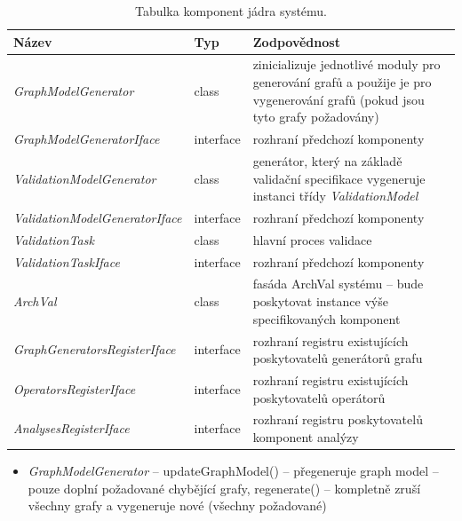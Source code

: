 \begin{table}
  \caption{Tabulka komponent jádra systému. \label{design-archval_core_components}}
  \begin{center}
    \begin{tabular}{ | l | l | p{7.5cm} | }
      \hline
      \textbf{Název} & \textbf{Typ} & \textbf{Zodpovědnost} \\
      \hline
      \hline
      \emph{GraphModelGenerator} & class & zinicializuje jednotlivé moduly pro generování grafů a použije je pro vygenerování grafů (pokud jsou tyto grafy požadovány) \\ \hline
      \emph{GraphModelGeneratorIface} & interface & rozhraní předchozí komponenty \\ \hline
      \emph{ValidationModelGenerator} & class & generátor, který na základě validační specifikace vygeneruje instanci třídy \mbox{\emph{ValidationModel}} \\ \hline
      \emph{ValidationModelGeneratorIface} & interface & rozhraní předchozí komponenty \\ \hline
      \emph{ValidationTask} & class & hlavní proces validace \\ \hline
      \emph{ValidationTaskIface} & interface & rozhraní předchozí komponenty \\ \hline
      \hline
      \emph{ArchVal} & class & fasáda ArchVal systému -- bude poskytovat instance výše specifikovaných komponent \\ \hline
      \hline
      \emph{GraphGeneratorsRegisterIface} & interface & rozhraní registru existujících poskytovatelů generátorů grafu \\ \hline
      \emph{OperatorsRegisterIface} & interface & rozhraní registru existujících poskytovatelů operátorů \\ \hline
      \emph{AnalysesRegisterIface} & interface & rozhraní registru poskytovatelů komponent analýzy \\ \hline
    \end{tabular}
  \end{center}

\end{table}

\begin{itemize}
\item \emph{GraphModelGenerator} -- updateGraphModel() -- přegeneruje graph model -- pouze doplní požadované chybějící grafy, regenerate() -- kompletně zruší všechny grafy a vygeneruje nové (všechny požadované)
\end{itemize}

